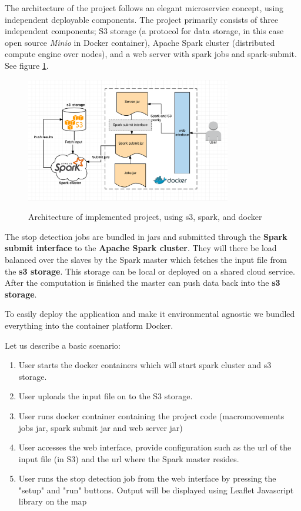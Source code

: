 The architecture of the project follows an elegant microservice concept, using independent deployable components.
The project primarily consists of three independent components; S3 storage (a protocol for data storage, in this case open source \textit{Minio} in Docker container), Apache Spark cluster (distributed compute engine over nodes), and a web server with spark jobs and spark-submit. See figure \ref{fig:architect}.

\begin{figure}[!ht]
	\centering
	\includegraphics[width=0.8\textwidth]{images/architect.png}\\
	\caption{ Architecture of implemented project, using s3, spark, and docker}
	\label{fig:architect}
\end{figure}
\FloatBarrier

The stop detection jobs are bundled in jars and submitted through the \textbf{Spark submit interface} to the \textbf{Apache Spark cluster}. They will there be load balanced over the slaves by the Spark master which fetches the input file from the \textbf{s3 storage}. This storage can be local or deployed on a shared cloud service. After the computation is finished the master can push data back into the \textbf{s3 storage}.

To easily deploy the application and make it environmental agnostic we bundled everything into the container platform Docker. 

Let us describe a basic scenario:

\begin{enumerate}
  \item 
User starts the docker containers which will start spark cluster and s3 storage.
  \item 
User uploads the input file on to the S3 storage.
  \item 
User runs docker container containing the project code (macromovements jobs jar, spark submit jar and web server jar)
  \item 
User accesses the web interface, provide configuration such as the url of the input file (in S3) and the url where the Spark master resides.  
  \item 
User runs the stop detection job from the web interface by pressing the "setup" and "run" buttons. Output will be displayed using Leaflet Javascript library on the map
\end{enumerate}

